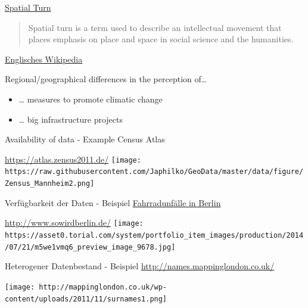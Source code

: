\documentclass[ignorenonframetext,]{beamer}
\providecommand{\tightlist}{%
  \setlength{\itemsep}{0pt}\setlength{\parskip}{0pt}}
\begin{document}
\begin{frame}{\href{https://de.wikipedia.org/wiki/Spatial_turn}{Spatial
Turn}}
\protect\hypertarget{spatial-turn}{}

\begin{quote}
Spatial turn is a term used to describe an intellectual movement that
places emphasis on place and space in social science and the humanities.
\end{quote}

\href{https://en.wikipedia.org/wiki/Spatial_turn}{Englisches Wikipedia}

\end{frame}

\begin{frame}{Regional/geographical differences in the perception
of\ldots{}}
\protect\hypertarget{regionalgeographical-differences-in-the-perception-of}{}

\begin{itemize}
\tightlist
\item
  \ldots{} measures to promote climatic change
\item
  \ldots{} big infrastructure projects
\end{itemize}

\end{frame}

\begin{frame}{Availability of data - Example Census Atlas}
\protect\hypertarget{availability-of-data---example-census-atlas}{}

\url{https://atlas.zensus2011.de/}
\texttt{[image: https://raw.githubusercontent.com/Japhilko/GeoData/master/data/figure/Zensus\_Mannheim2.png]}

\end{frame}

\begin{frame}{Verfügbarkeit der Daten - Beispiel
\href{http://michael-hoerz.de/maps/berlin-bike/}{Fahrradunfälle in
Berlin}}
\protect\hypertarget{verfugbarkeit-der-daten---beispiel-fahrradunfalle-in-berlin}{}

\url{http://www.sowirdberlin.de/}
\texttt{[image: https://asset0.torial.com/system/portfolio\_item\_images/production/2014/07/21/m5we1vmq6\_preview\_image\_9678.jpg]}

\end{frame}

\begin{frame}{Heterogener Datenbestand - Beispiel
\url{http://names.mappinglondon.co.uk/}}
\protect\hypertarget{heterogener-datenbestand---beispiel-httpnames.mappinglondon.co.uk}{}

\texttt{[image: http://mappinglondon.co.uk/wp-content/uploads/2011/11/surnames1.png]}

\end{frame}
\end{document}
